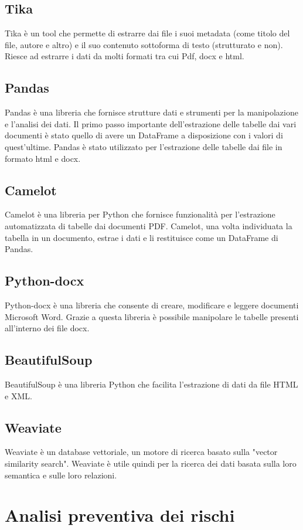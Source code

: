 \subsection{Tika}
Tika è un tool che permette di estrarre dai file i suoi metadata (come titolo del file, autore e altro) e il suo contenuto sottoforma di testo (strutturato e non).
Riesce ad estrarre i dati da molti formati tra cui Pdf, docx e html.
\subsection{Pandas}
Pandas è una libreria che fornisce strutture dati e strumenti per la manipolazione e l'analisi dei dati.
Il primo passo importante dell'estrazione delle tabelle dai vari documenti è stato quello di avere un DataFrame a disposizione con i valori di quest'ultime. 
Pandas è stato utilizzato per l'estrazione delle tabelle dai file in formato html e docx.
\subsection{Camelot}
Camelot è una libreria per Python che fornisce funzionalità per l'estrazione automatizzata di tabelle dai documenti PDF.
Camelot, una volta individuata la tabella in un documento, estrae i dati e li restituisce come un DataFrame di Pandas.
\subsection{Python-docx}
Python-docx è una libreria che consente di creare, modificare e leggere documenti Microsoft Word.
Grazie a questa libreria è possibile manipolare le tabelle presenti all'interno dei file docx.
\subsection{BeautifulSoup}
BeautifulSoup è una libreria Python che facilita l'estrazione di dati da file HTML e XML.
\subsection{Weaviate}
Weaviate è un database vettoriale, un motore di ricerca basato sulla "vector similarity search".
Weaviate è utile quindi per la ricerca dei dati basata sulla loro semantica e sulle loro relazioni. 

\section{Analisi preventiva dei rischi}

